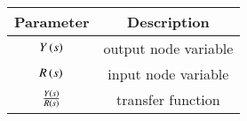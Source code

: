 \begin{tabular}{|c|c|}
\hline
\textbf{Parameter} & \textbf{Description}\\ \hline
$Y\left(s\right)$ & output node variable \\ \hline
$R\left(s\right)$ & input node variable \\ \hline
$\frac{Y\left(s\right)}{R\left(s\right)}$ & transfer function \\ \hline
\end{tabular}
